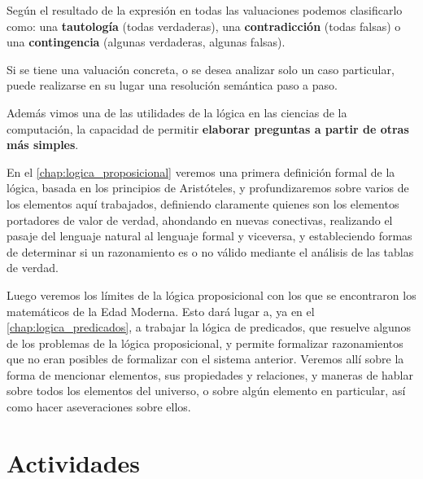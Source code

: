 Según el resultado de la expresión en todas las valuaciones podemos clasificarlo
como: una \textbf{tautología} (todas verdaderas), una \textbf{contradicción}
(todas falsas) o una \textbf{contingencia} (algunas verdaderas, algunas falsas).

Si se tiene una valuación concreta, o se desea analizar solo un caso particular,
puede realizarse en su lugar una resolución semántica paso a paso.

Además vimos una de las utilidades de la lógica en las ciencias de la
computación, la capacidad de permitir \textbf{elaborar preguntas a partir de
otras más simples}.

En el \autoref{chap:logica_proposicional} veremos una primera definición formal
de la lógica, basada en los principios de Aristóteles, y profundizaremos sobre
varios de los elementos aquí trabajados, definiendo claramente quienes son los
elementos portadores de valor de verdad, ahondando en nuevas conectivas,
realizando el pasaje del lenguaje natural al lenguaje formal y viceversa, y
estableciendo formas de determinar si un razonamiento es o no válido mediante el
análisis de las tablas de verdad.

Luego veremos los límites de la lógica proposicional con los que se encontraron
los matemáticos de la Edad Moderna. Esto dará lugar a, ya en el
\autoref{chap:logica_predicados}, a trabajar la lógica de predicados, que
resuelve algunos de los problemas de la lógica proposicional, y permite
formalizar razonamientos que no eran posibles de formalizar con el sistema
anterior. Veremos allí sobre la forma de mencionar elementos, sus propiedades y
relaciones, y maneras de hablar sobre todos los elementos del universo, o sobre
algún elemento en particular, así como hacer aseveraciones sobre ellos.

\section{Actividades}
\label{chap:logica:sec:actividades}


